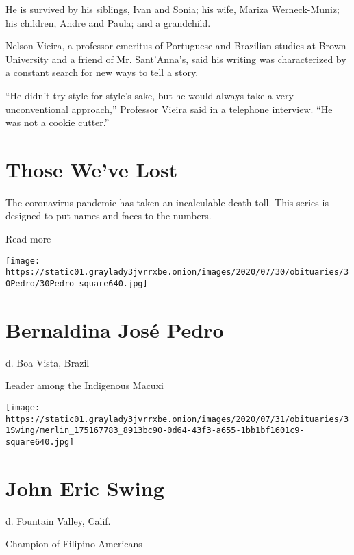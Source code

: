 He is survived by his siblings, Ivan and Sonia; his wife, Mariza
Werneck-Muniz; his children, Andre and Paula; and a grandchild.

Nelson Vieira, a professor emeritus of Portuguese and Brazilian studies
at Brown University and a friend of Mr. Sant'Anna's, said his writing
was characterized by a constant search for new ways to tell a story.

``He didn't try style for style's sake, but he would always take a very
unconventional approach,'' Professor Vieira said in a telephone
interview. ``He was not a cookie cutter.''

\href{https://www.nytimes3xbfgragh.onion/interactive/2020/obituaries/people-died-coronavirus-obituaries.html?action=click\&pgtype=Article\&state=default\&region=BELOW_MAIN_CONTENT\&context=covid_obits_promo}{}

\hypertarget{those-weve-lost}{%
\section{Those We've Lost}\label{those-weve-lost}}

The coronavirus pandemic has taken an incalculable death toll. This
series is designed to put names and faces to the numbers.

Read more

\texttt{[image: https://static01.graylady3jvrrxbe.onion/images/2020/07/30/obituaries/30Pedro/30Pedro-square640.jpg]}

\hypertarget{bernaldina-josuxe9-pedro}{%
\section{Bernaldina José Pedro}\label{bernaldina-josuxe9-pedro}}

d. Boa Vista, Brazil

Leader among the Indigenous Macuxi

\texttt{[image: https://static01.graylady3jvrrxbe.onion/images/2020/07/31/obituaries/31Swing/merlin\_175167783\_8913bc90-0d64-43f3-a655-1bb1bf1601c9-square640.jpg]}

\hypertarget{john-eric-swing}{%
\section{John Eric Swing}\label{john-eric-swing}}

d. Fountain Valley, Calif.

Champion of Filipino-Americans

